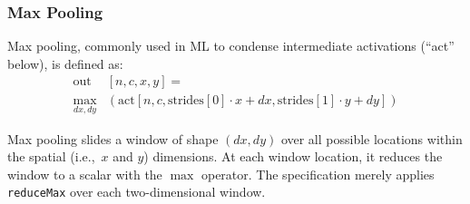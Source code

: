 %
%  

\subsubsection*{Max Pooling}

Max pooling, commonly used in ML
  to condense intermediate activations (``act'' below),
  is defined as:
\begin{equation*}%
\begin{split} 
\mbox{out}&[n, c, x, y] =\\
\max_{dx, dy}&
           (\mbox{act}[n, c,
                       \mbox{strides}[0] \cdot x  + dx,
                       \mbox{strides}[1] \cdot y + dy])
\end{split}
\end{equation*}

Max pooling 
  slides a window
  of shape $(dx, dy)$
  over all possible locations
  within the spatial (i.e.,~$x$ and $y$)
  dimensions.
At each window location,
  it reduces the window
  to a scalar
  with the $\max$ operator.
The \g specification merely applies
  \texttt{reduceMax} 
  over each two-dimensional window.
  
